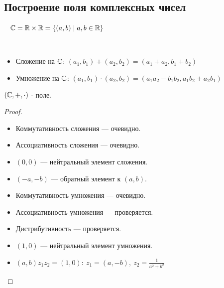 \subsection{Построение поля комплексных чисел}

\begin{defn}~
    $\mathbb{C} = \mathbb{R} \times \mathbb{R} = \{(a, b) \mid a, b \in \mathbb{R}\}$
\end{defn}

\begin{defn} \
    \begin{itemize}
        \item Сложение на $\mathbb{C}$: $(a_1, b_1) + (a_2, b_2) = (a_1 + a_2, b_1 + b_2)$
        
        \item Умножение на $\mathbb{C}$: $(a_1, b_1) \cdot (a_2, b_2) = (a_1a_2 - b_1b_2, a_1b_2 + a_2b_1)$
    \end{itemize}
\end{defn}

\begin{theorem-non}
    $(\mathbb{C}, +, \cdot)$ - поле.
\end{theorem-non}

\begin{proof}
    \begin{itemize}
        \item Коммутативность сложения --- очевидно.
        
        \item Ассоциативность сложения --- очевидно.
        
        \item $(0, 0)$ --- нейтральный элемент сложения.
        
        \item $(-a, -b)$ --- обратный элемент к $(a, b)$.
        
        \item Коммутативность умножения --- очевидно.
        
        \item Ассоциативность умножения --- проверяется.
        
        \item Дистрибутивность --- проверяется.
        
        \item $(1, 0)$ --- нейтральный элемент умножения.
        
        \item $(a, b) z_1 z_2 = (1, 0):~z_1 = (a, -b),~z_2=\frac{1}{a^2+b^2}$
    \end{itemize}
\end{proof}

